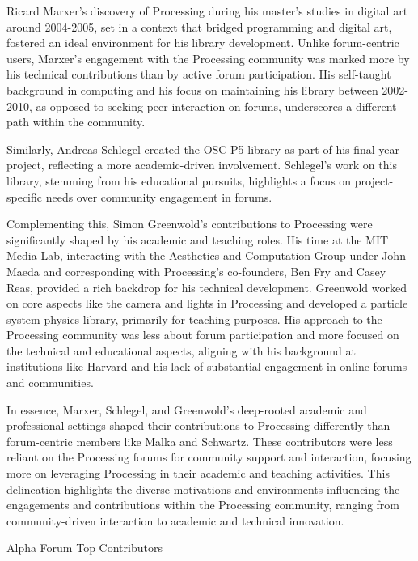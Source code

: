 Ricard Marxer's discovery of Processing during his master's studies in digital art around 2004-2005, set in a context that bridged programming and digital art, fostered an ideal environment for his library development. Unlike forum-centric users, Marxer's engagement with the Processing community was marked more by his technical contributions than by active forum participation. His self-taught background in computing and his focus on maintaining his library between 2002-2010, as opposed to seeking peer interaction on forums, underscores a different path within the community​​​​.

Similarly, Andreas Schlegel created the OSC P5 library as part of his final year project, reflecting a more academic-driven involvement. Schlegel's work on this library, stemming from his educational pursuits, highlights a focus on project-specific needs over community engagement in forums​​.

Complementing this, Simon Greenwold's contributions to Processing were significantly shaped by his academic and teaching roles. His time at the MIT Media Lab, interacting with the Aesthetics and Computation Group under John Maeda and corresponding with Processing's co-founders, Ben Fry and Casey Reas, provided a rich backdrop for his technical development. Greenwold worked on core aspects like the camera and lights in Processing and developed a particle system physics library, primarily for teaching purposes. His approach to the Processing community was less about forum participation and more focused on the technical and educational aspects, aligning with his background at institutions like Harvard and his lack of substantial engagement in online forums and communities​​​​.

In essence, Marxer, Schlegel, and Greenwold's deep-rooted academic and professional settings shaped their contributions to Processing differently than forum-centric members like Malka and Schwartz. These contributors were less reliant on the Processing forums for community support and interaction, focusing more on leveraging Processing in their academic and teaching activities. This delineation highlights the diverse motivations and environments influencing the engagements and contributions within the Processing community, ranging from community-driven interaction to academic and technical innovation.

\changepapersize{305.3mm:210mm}

{
	\LARGE
	\noindent Alpha Forum Top Contributors\par
	\vspace{0.2cm} 
}
\vfill

